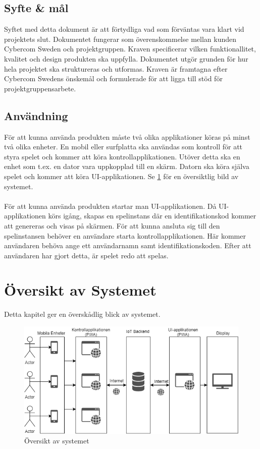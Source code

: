 \documentclass[10pt]{article}
\begin{document}
	\subsection{Syfte \& mål}
	Syftet med detta dokument är att förtydliga vad som förväntas vara klart vid projektets slut. Dokumentet fungerar som överenskommelse mellan kunden Cybercom Sweden och projektgruppen. Kraven specificerar vilken funktionallitet, kvalitet och design produkten ska uppfylla. Dokumentet utgör grunden för hur hela projektet ska struktureras och utformas. Kraven är framtagna efter Cybercom Swedens önskemål och formulerade för att ligga till stöd för projektgruppensarbete.
	
	\subsection{Användning}
		För att kunna använda produkten måste två olika applikationer köras på minst två olika enheter. En mobil eller surfplatta ska användas som kontroll för att styra spelet och kommer att köra kontrollapplikationen. Utöver detta ska en enhet som t.ex. en dator vara uppkopplad till en skärm. Datorn ska köra själva spelet och kommer att köra UI-applikationen. Se \ref{fig:overview} för en översiktlig bild av systemet. \\
\\
För att kunna använda produkten startar man UI-applikationen. Då UI-applikationen körs igång, skapas en spelinstans där en identifikationskod kommer att genereras och visas på skärmen. För att kunna ansluta sig till den spelinstansen behöver en användare starta kontrollapplikationen. Här kommer användaren behöva ange ett användarnamn samt identifikationskoden. Efter att användaren har gjort detta, är spelet redo att spelas.

\pagebreak

\section{Översikt av Systemet}
	Detta kapitel ger en överskådlig blick av systemet.
	
	\begin{figure}[h]
		\centering
		\includegraphics[scale=0.8]{overview}
		\caption{Översikt av systemet}
		\label{fig:overview}
	\end{figure}
\end{document}
